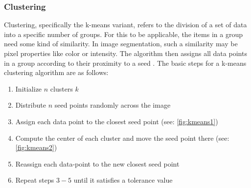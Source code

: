 \subsubsection{Clustering}
Clustering, specifically the k-means variant, refers to the division of a set of data into
a specific number of groups.
For this to be applicable, the items in a group need some kind of similarity.
In image segmentation, such a similarity may be pixel properties like color or intensity.
The algorithm then assigns all data points in a group according to their proximity to a seed \cite{dhanachandraImageSegmentationUsing2015}.
The basic steps for a k-means clustering algorithm are as follows:
\begin{enumerate}
	\item Initialize $n$ clusters $k$
	\item Distribute $n$ seed points randomly across the image
	\item Assign each data point to the closest seed point (see: \cref{fig:kmeans1})
	\item Compute the center of each cluster and move the seed point there (see: \cref{fig:kmeans2})
	\item Reassign each data-point to the new closest seed point
	\item Repeat steps $3 - 5$ until it satisfies a tolerance value
\end{enumerate}
